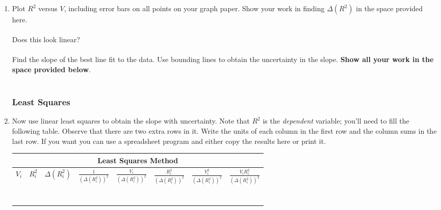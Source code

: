 \begin{enumerate}

\item Plot $R^2$ versus $V$, including error bars on all points
on your graph paper.  Show your work in finding
$\Delta(R^2)$ in the space provided here. \\
\vspace*{2cm} \\
\noindent Does this look linear? \\
\vspace*{1cm} \\
\noindent Find the slope of the best 
line fit to the data. Use bounding lines to obtain the uncertainty in the 
slope.  {\bf Show all your work in the space provided below}. \\
\vspace*{8cm} \\

\subsubsection{Least Squares}
\item Now use linear least squares to obtain the slope with uncertainty. Note 
that $R^2$ is the {\it dependent} variable; you'll need to fill the following
table. Observe that there are two extra rows in it. Write the units of each column in the first row and the column sums in the last row. If you want you can use a spreadsheet program and either copy the results here or print it. %
\begin{center}
\begin{tabular}{|c|c|c|c|c|c|c|c|}
\hline
\multicolumn{8}{|c|}{Least Squares Method}\\
\hline 
  $V_i$ & $R_i^2$ & $\Delta (R_i^2)$ & $\frac{1}{(\Delta (R_i^2) )^2}$ &
$\frac{V_i}{(\Delta (R_i^2) )^2}$ & $\frac{R_i^2}{(\Delta (R_i^2) )^2}$ & 
$\frac{V_i^2}{(\Delta (R_i^2) )^2}$ & 
$\frac{V_i R_i^2}{(\Delta (R_i^2) )^2}$ \\
\hline
 & &  &  &  &  &  &  \\
\hline
 & &  &  &  &  &  &  \\
\hline
 & &  &  &  &  &  &  \\
\hline
 & &  &  &  &  &  &  \\
\hline
 & &  &  &  &  &  &  \\
\hline
 & &  &  &  &  &  &  \\
\hline
 & &  &  &  &  &  &  \\
\hline
\end{tabular}
\end{center} 


\end{enumerate}
